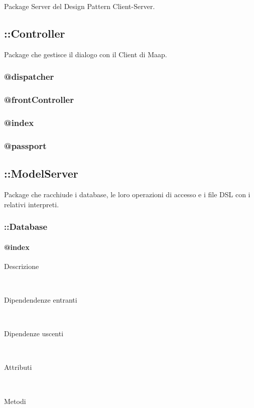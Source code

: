 Package Server del Design Pattern Client-Server. 

\subsection{::Controller}
Package che gestisce il dialogo con il Client di Maap. 
\subsubsection{@dispatcher}
\subsubsection{@frontController}
\subsubsection{@index}
\subsubsection{@passport}

\subsection{::ModelServer}
Package che racchiude i database, le loro operazioni di accesso e i file 
DSL con i relativi interpreti.

\subsubsection{::Database}
\paragraph{@index}
\begin{description}
 \item[Descrizione] \hfill \\

 \item[Dipendendenze entranti] \hfill \\
 
 \item[Dipendenze uscenti] \hfill \\
 
 \item[Attributi] \hfill \\
 
 \item[Metodi] \hfill \\
\end{description}

